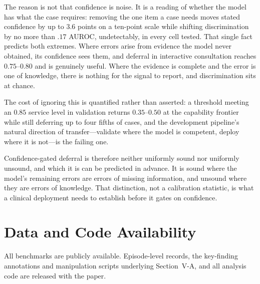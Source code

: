 \documentclass[journal,twoside]{IEEEtran}
\begin{document}
The reason is not that confidence is noise. It is a reading of whether the model has what the case
requires: removing the one item a case needs moves stated confidence by up to $3.6$ points on a
ten-point scale while shifting discrimination by no more than $.17$ AUROC, undetectably, in every
cell tested. That
single fact predicts both extremes. Where errors arise from evidence the model never obtained, its
confidence sees them, and deferral in interactive consultation reaches $0.75$--$0.80$ and is
genuinely useful. Where the evidence is complete and the error is one of knowledge, there is nothing
for the signal to report, and discrimination sits at chance.

The cost of ignoring this is quantified rather than asserted: a threshold meeting an $0.85$ service
level in validation returns $0.35$--$0.50$ at the capability frontier while still deferring up to
four fifths of cases, and the development pipeline's natural direction of transfer---validate where
the model is competent, deploy where it is not---is the failing one.

Confidence-gated deferral is therefore neither uniformly sound nor uniformly unsound, and which it is
can be predicted in advance. It is sound where the model's remaining errors are errors of missing
information, and unsound where they are errors of knowledge. That distinction, not a calibration
statistic, is what a clinical deployment needs to establish before it gates on confidence.

\section*{Data and Code Availability}
All benchmarks are publicly available. Episode-level records, the key-finding annotations and
manipulation scripts underlying Section~V-A, and all analysis code are released with the paper.
\end{document}

